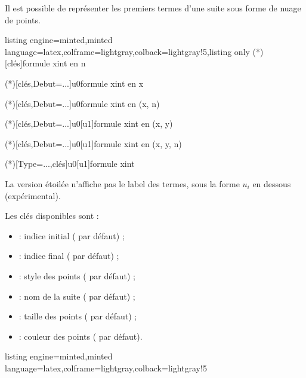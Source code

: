 \documentclass[11pt,a4paper]{ltxdoc}
\begin{document}
Il est possible de représenter les premiers termes d'une suite sous forme de nuage de points.

\begin{tcblisting}{listing engine=minted,minted language=latex,colframe=lightgray,colback=lightgray!5,listing only}
\TracerNuageSuite(*)[clés]{formule xint en n}

\TracerNuageSuiteF(*)[clés,Debut=...]{u0}{formule xint en x}

\TracerNuageSuiteFn(*)[clés,Debut=...]{u0}{formule xint en (x, n)}

\TracerNuageSuiteDouble(*)[clés,Debut=...]{u0}[u1]{formule xint en (x, y)}

\TracerNuageSuiteDoubleN(*)[clés,Debut=...]{u0}[u1]{formule xint en (x, y, n)}

\TracerNuageSuiteAuto(*)[Type=...,clés]{u0}[u1]{formule xint}
\end{tcblisting}

La version étoilée n'affiche pas le label des termes, sous la forme $u_{i}$ en dessous (expérimental).

\smallskip

Les clés disponibles sont :

\begin{itemize}
  \item {} : indice initial ( par défaut) ;
  \item {} : indice final ( par défaut) ;
  \item {} : style des points ( par défaut) ;
  \item {} : nom de la suite ( par défaut) ;
  \item {} : taille des points (\MontreCode{1.75pt} par défaut) ;
  \item {} : couleur des points ( par défaut).
\end{itemize}

\begin{tcblisting}{listing engine=minted,minted language=latex,colframe=lightgray,colback=lightgray!5}
\begin{GraphiqueTikz}[Xmin=0,Xmax=12,Ymin=0,Ymax=5]
\end{GraphiqueTikz}
\end{tcblisting}
\end{document}
